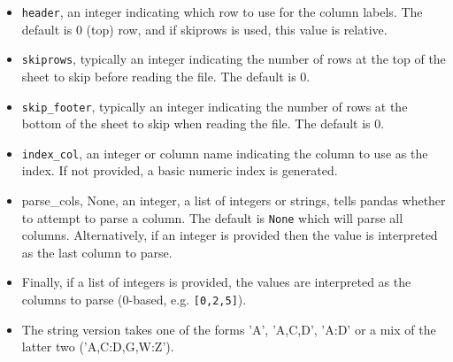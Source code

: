 \documentclass[KSmain.tex]{subfiles}
\begin{document}
	\begin{itemize}
		\item \texttt{header}, an integer indicating which row to use for the column labels. The default is 0 (top) row, and
		if skiprows is used, this value is relative.
		\item \texttt{skiprows}, typically an integer indicating the number of rows at the top of the sheet to skip before
		reading the file. The default is 0.
		\item \texttt{skip\_footer}, typically an integer indicating the number of rows at the bottom of the sheet to skip
		when reading the file. The default is 0.
		\item \texttt{index\_col}, an integer or column name indicating the column to use as the index. If not provided, a
		basic numeric index is generated.
		\item parse\_cols, None, an integer, a list of integers or strings, tells pandas whether to attempt to parse
		a column. The default is \texttt{None} which will parse all columns. Alternatively, if an integer is provided
		then the value is interpreted as the last column to parse. 
		\item Finally, if a list of integers is provided, the
		values are interpreted as the columns to parse (0-based, e.g. \texttt{[0,2,5]}). 
		\item The string version takes one
		of the forms ’A’, ’A,C,D’, ’A:D’ or a mix of the latter two (’A,C:D,G,W:Z’).
	\end{itemize}
\end{document}
